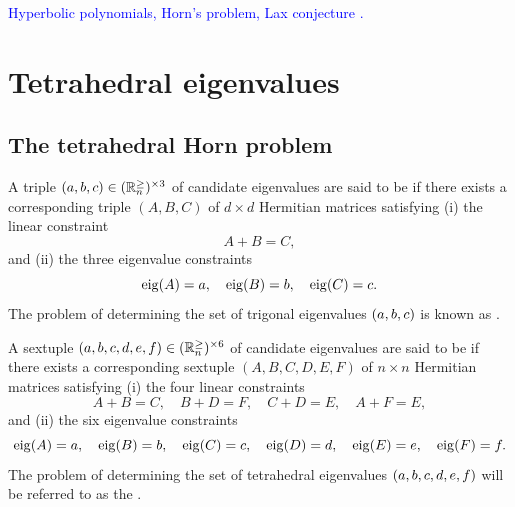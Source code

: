 \documentclass[notitlepage, 10pt]{article}
\begin{document}
\textcolor{blue}{Hyperbolic polynomials, Horn's problem, Lax conjecture \cite{serre2009weyl,speyer2005horn}.}

\section{Tetrahedral eigenvalues}
\label{sec:tet_eig}

\subsection{The tetrahedral Horn problem}
\begin{prob}
    \label{prob:tri_problem}
    A triple $(a,b,c) \in (\mathbb R^{\geq}_{n})^{\times 3}$ of candidate eigenvalues are said to be  if there exists a corresponding triple $(A,B,C)$ of $d\times d$ Hermitian matrices satisfying (i) the linear constraint
    \begin{equation}
        \label{eq:tri_linear_constraints}
        A + B = C,
    \end{equation}
    and (ii) the three eigenvalue constraints
    \begin{equation}
        \label{eq:tri_eigenvalue_constraints}
        \operatorname{eig}(A) = a, \quad
        \operatorname{eig}(B) = b, \quad
        \operatorname{eig}(C) = c.
    \end{equation}
    The problem of determining the set of trigonal eigenvalues $(a,b,c)$ is known as .
\end{prob}

\begin{prob}
    \label{prob:tet_problem}
    A sextuple $(a,b,c,d,e,f) \in (\mathbb R^{\geq}_{n})^{\times 6}$ of candidate eigenvalues are said to be  if there exists a corresponding sextuple $(A,B,C,D,E,F)$ of $n\times n$ Hermitian matrices satisfying (i) the four linear constraints
    \begin{equation}
        \label{eq:tet_linear_constraints}
        A + B = C, \quad
        B + D = F, \quad
        C + D = E, \quad
        A + F = E,
    \end{equation}
    and (ii) the six eigenvalue constraints
    \begin{equation}
        \label{eq:tet_eigenvalue_constraints}
        \operatorname{eig}(A) = a, \quad
        \operatorname{eig}(B) = b, \quad
        \operatorname{eig}(C) = c, \quad
        \operatorname{eig}(D) = d, \quad
        \operatorname{eig}(E) = e, \quad
        \operatorname{eig}(F) = f.
    \end{equation}
    The problem of determining the set of tetrahedral eigenvalues $(a,b,c,d,e,f)$ will be referred to as the .
\end{prob}
\end{document}
